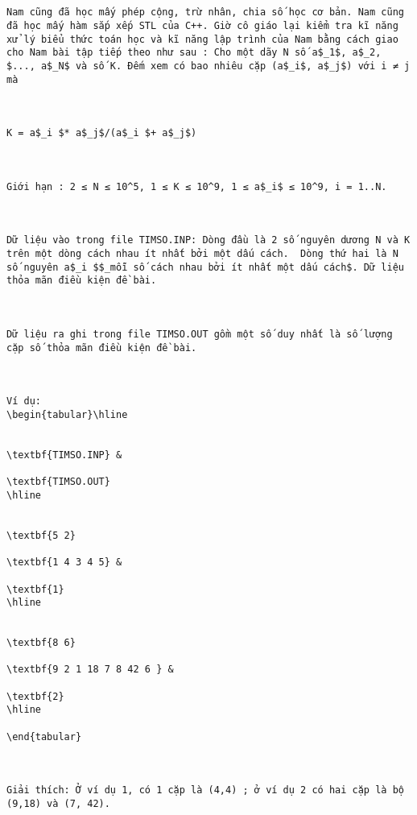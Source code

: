 
\begin{verbatim}


Nam cũng đã học mấy phép cộng, trừ nhân, chia số học cơ bản. Nam cũng đã học mấy hàm sắp xếp STL của C++. Giờ cô giáo lại kiểm tra kĩ năng xử lý biểu thức toán học và kĩ năng lập trình của Nam bằng cách giao cho Nam bài tập tiếp theo như sau : Cho một dãy N số a$_1$, a$_2­, $..., a­$_N$ và số K. Đếm xem có bao nhiêu cặp (a$_i$, a$_j$) với i ≠ j mà

 

K = a$_i $* a$_j$/(a$_i $+ a$_j$)

 

Giới hạn : 2 ≤ N ≤ 10^5, 1 ≤ K ≤ 10^9, 1 ≤ a$_i$ ≤ 10^9, i = 1..N.

 

Dữ liệu vào trong file TIMSO.INP: Dòng đầu là 2 số nguyên dương N và K trên một dòng cách nhau ít nhất bởi một dấu cách.  Dòng thứ hai là N số nguyên a$_i $$_mỗi số cách nhau bởi ít nhất một dấu cách$. Dữ liệu thỏa mãn điều kiện đề bài.

 

Dữ liệu ra ghi trong file TIMSO.OUT gồm một số duy nhất là số lượng cặp số thỏa mãn điều kiện đề bài.

 

Ví dụ:
\begin{tabular}\hline 


\textbf{TIMSO.INP} & 

\textbf{TIMSO.OUT}  
\hline


\textbf{5 2}

\textbf{1 4 3 4 5} & 

\textbf{1}  
\hline


\textbf{8 6}

\textbf{9 2 1 18 7 8 42 6 } & 

\textbf{2}  
\hline

\end{tabular}

 

Giải thích: Ở ví dụ 1, có 1 cặp là (4,4) ; ở ví dụ 2 có hai cặp là bộ (9,18) và (7, 42).\end{verbatim}
